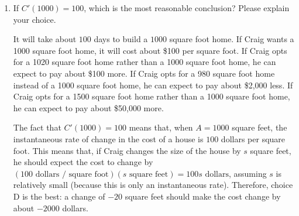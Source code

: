 \documentclass{article}
\renewcommand{\answer}[1]{#1}
\theoremstyle{theorem}
\begin{document}
\begin{enumerate}
\begin{enumerate}
    \begin{solution}
      The units of $\frac{dC}{dA}$ are the units of $C$ (dollars) over
      the units of $A$ (square feet), or .

      If you prefer to think graphically, remember that we visualize the derivative as the slope of a line tangent to the graph of $C$. Even though we don't know what the graph of $C$ looks like, we know that the axes should be:
      \begin{center}
      \end{center}
      So, a slope on this graph should have units of dollars per square
      foot. 
    \end{solution}

  \item
    If $C'(1000) = 100$, which is the most reasonable conclusion?  Please
    explain your choice. 
    \begin{altenumerate}[label=\protect\maybecircle{\Alph*.}]
    \plainitem It will take about $100$ days to build a $1000$ square foot
      home.
    \plainitem If Craig wants a 1000 square foot home, it will cost about
      \$100 per square foot.
    \plainitem If Craig opts for a 1020 square foot home rather than a
      1000 square foot home, he can expect to pay about \$100 more.
    \circleitem If Craig opts for a 980 square foot home instead of a 1000
      square foot home, he can expect to pay about \$2,000 less. 
    \plainitem If Craig opts for a 1500 square foot home rather than a
      1000 square foot home, he can expect to pay about \$50,000 more.
    \end{altenumerate}

    \pspace{\vfill\newpage}

    \begin{solution}
      The fact that $C'(1000) = 100$ means that, when $A = 1000$ square feet, the instantaneous rate of change in the cost of a house is $100$ dollars per square foot. This means that, if Craig changes the size of the house by $s$ square feet, he should expect the cost to change by $(100 \text{ dollars / square foot})(s \text{ square feet}) = 100s \text{ dollars}$, assuming $s$ is relatively small (because this is only an instantaneous rate). Therefore, choice \answer{D} is the best: a change of $-20$ square feet should make the cost change by about $-2000$ dollars.
    \end{solution}

  \end{enumerate}

\end{enumerate}
\end{document}
